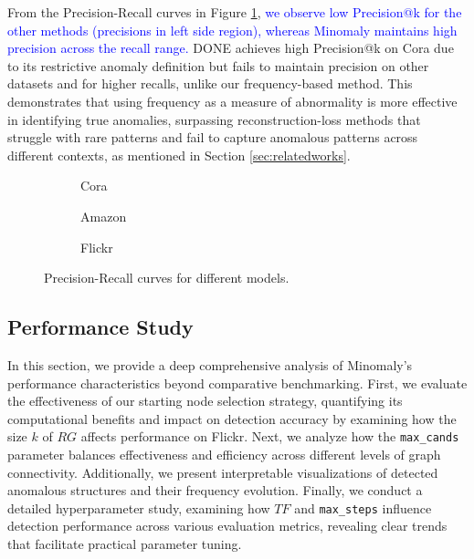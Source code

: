 \documentclass[preprint,12pt]{elsarticle}
\newcommand{\new}[1]{\textcolor{blue}{#1}}
\theoremstyle{plain}
\theoremstyle{definition}
\theoremstyle{remark}
\begin{document}
From the Precision-Recall curves in Figure \ref{fig:pr_curve}, \new{we observe low Precision@k for the other methods (precisions in left side region), whereas Minomaly maintains high precision across the recall range.} DONE achieves high Precision@k on Cora due to its restrictive anomaly definition but fails to maintain precision on other datasets and for higher recalls, unlike our frequency-based method. This demonstrates that using frequency as a measure of abnormality is more effective in identifying true anomalies, surpassing reconstruction-loss methods that struggle with rare patterns and fail to capture anomalous patterns across different contexts, as mentioned in Section \ref{sec:relatedworks}.


\begin{figure}[htbp]
    \centering
    \begin{subfigure}{0.32\textwidth}
        \resizebox{\linewidth}{!}{}
        \caption{Cora}
    \end{subfigure}
    \begin{subfigure}{0.32\textwidth}
        \resizebox{\linewidth}{!}{}
        \caption{Amazon}
    \end{subfigure}
    \begin{subfigure}{0.32\textwidth}
        \resizebox{\linewidth}{!}{}
        \caption{Flickr}
    \end{subfigure}
    \caption{Precision-Recall curves for different models.}
    \label{fig:pr_curve}
\end{figure}

\subsection{Performance Study}


In this section, we provide a deep comprehensive analysis of Minomaly's performance characteristics beyond comparative benchmarking. First, we evaluate the effectiveness of our starting node selection strategy, quantifying its computational benefits and impact on detection accuracy by examining how the size $k$ of $RG$ affects performance on Flickr. Next, we analyze how the \texttt{max\_cands} parameter balances effectiveness and efficiency across different levels of graph connectivity. Additionally, we present interpretable visualizations of detected anomalous structures and their frequency evolution. Finally, we conduct a detailed hyperparameter study, examining how $TF$ and \texttt{max\_steps} influence detection performance across various evaluation metrics, revealing clear trends that facilitate practical parameter tuning.
\end{document}
